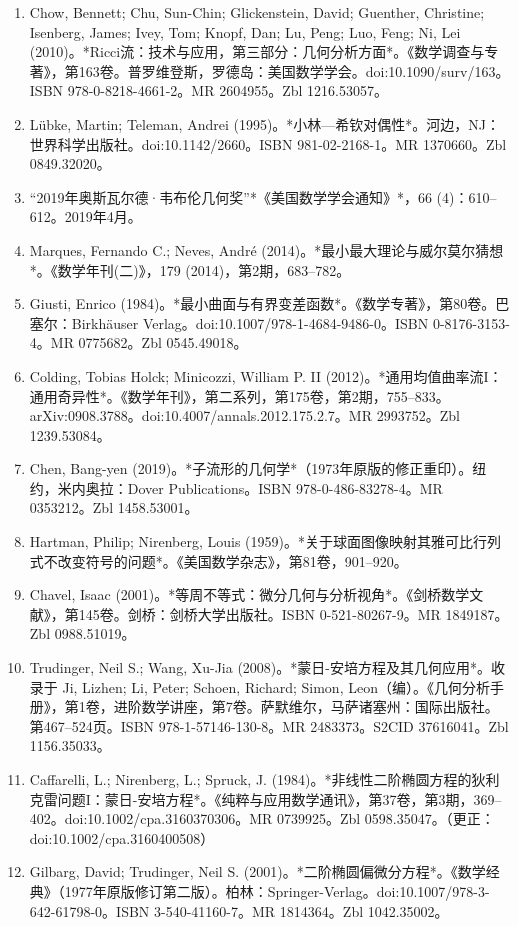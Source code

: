 \begin{enumerate}
\item Chow, Bennett; Chu, Sun-Chin; Glickenstein, David; Guenther, Christine; Isenberg, James; Ivey, Tom; Knopf, Dan; Lu, Peng; Luo, Feng; Ni, Lei (2010)。*Ricci流：技术与应用，第三部分：几何分析方面*。《数学调查与专著》，第163卷。普罗维登斯，罗德岛：美国数学学会。doi:10.1090/surv/163。ISBN 978-0-8218-4661-2。MR 2604955。Zbl 1216.53057。  
\item Lübke, Martin; Teleman, Andrei (1995)。*小林—希钦对偶性*。河边，NJ：世界科学出版社。doi:10.1142/2660。ISBN 981-02-2168-1。MR 1370660。Zbl 0849.32020。  
\item “2019年奥斯瓦尔德·韦布伦几何奖”*《美国数学学会通知》*，66 (4)：610–612。2019年4月。  
\item Marques, Fernando C.; Neves, André (2014)。*最小最大理论与威尔莫尔猜想*。《数学年刊(二)》，179 (2014)，第2期，683–782。
\item Giusti, Enrico (1984)。*最小曲面与有界变差函数*。《数学专著》，第80卷。巴塞尔：Birkhäuser Verlag。doi:10.1007/978-1-4684-9486-0。ISBN 0-8176-3153-4。MR 0775682。Zbl 0545.49018。  
\item Colding, Tobias Holck; Minicozzi, William P. II (2012)。*通用均值曲率流I：通用奇异性*。《数学年刊》，第二系列，第175卷，第2期，755–833。arXiv:0908.3788。doi:10.4007/annals.2012.175.2.7。MR 2993752。Zbl 1239.53084。  
\item Chen, Bang-yen (2019)。*子流形的几何学*（1973年原版的修正重印）。纽约，米内奥拉：Dover Publications。ISBN 978-0-486-83278-4。MR 0353212。Zbl 1458.53001。  
\item Hartman, Philip; Nirenberg, Louis (1959)。*关于球面图像映射其雅可比行列式不改变符号的问题*。《美国数学杂志》，第81卷，901–920。
\item Chavel, Isaac (2001)。*等周不等式：微分几何与分析视角*。《剑桥数学文献》，第145卷。剑桥：剑桥大学出版社。ISBN 0-521-80267-9。MR 1849187。Zbl 0988.51019。  
\item Trudinger, Neil S.; Wang, Xu-Jia (2008)。*蒙日-安培方程及其几何应用*。收录于 Ji, Lizhen; Li, Peter; Schoen, Richard; Simon, Leon（编）。《几何分析手册》，第1卷，进阶数学讲座，第7卷。萨默维尔，马萨诸塞州：国际出版社。第467–524页。ISBN 978-1-57146-130-8。MR 2483373。S2CID 37616041。Zbl 1156.35033。  
\item Caffarelli, L.; Nirenberg, L.; Spruck, J. (1984)。*非线性二阶椭圆方程的狄利克雷问题I：蒙日-安培方程*。《纯粹与应用数学通讯》，第37卷，第3期，369–402。doi:10.1002/cpa.3160370306。MR 0739925。Zbl 0598.35047。（更正：doi:10.1002/cpa.3160400508）  
\item Gilbarg, David; Trudinger, Neil S. (2001)。*二阶椭圆偏微分方程*。《数学经典》（1977年原版修订第二版）。柏林：Springer-Verlag。doi:10.1007/978-3-642-61798-0。ISBN 3-540-41160-7。MR 1814364。Zbl 1042.35002。

\end{enumerate}
